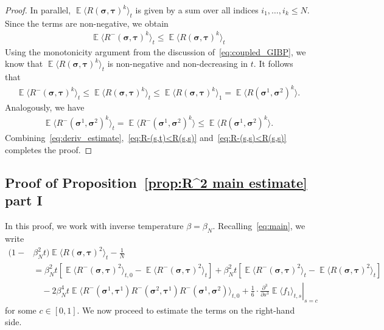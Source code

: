 \documentclass[letterpaper,11pt,reqno]{amsart}
\renewcommand{\leq}{\leqslant}
\newcommand{\ra}{\rangle}
\newcommand{\la}{\langle}
\newcommand{\mvgs}{\boldsymbol{\sigma}}\newcommand{\mvgS}{\boldsymbol{\Sigma}}\newcommand{\mvgt}{\boldsymbol{\tau}}
\DeclareMathOperator{\E}{\mathds{E}}
\begin{document}
\begin{proof}
    In parallel, \(\E \la R(\mvgs, \mvgt)^k \ra_{t}\) is given by a sum over all indices \(i_1, \ldots,i_k \leq N\). 
    Since the terms are non-negative, we obtain
    \begin{align*}
        \E \la R^-(\mvgs, \mvgt)^k \ra_{t} \leq  \E \la R(\mvgs, \mvgt)^k \ra_{t}
    \end{align*}
    Using the monotonicity argument from the discussion of~\eqref{eq:coupled_GIBP}, we know that \(\E \la R(\mvgs, \mvgt)^k \ra_{t}\) is non-negative and non-decreasing in \(t\). It follows that
    \begin{align}\label{eq:R-(s,t)<R(s,s)}
        \E \la R^-(\mvgs, \mvgt)^k \ra_{t}
        \leq \E \la R(\mvgs, \mvgt)^k \ra_{t}
        \leq \E \la R(\mvgs, \mvgt)^k \ra_{1}
        = \E \la R(\mvgs^1, \mvgs^2)^k \ra.
    \end{align}
    Analogously, we have 
    \begin{align}\label{eq:R-(s,s)<R(s,s)}
        \E \la R^-(\mvgs^1, \mvgs^2)^k \ra_{t}
        = \E \la R^-(\mvgs^1, \mvgs^2)^k \ra
        \leq \E \la R(\mvgs^1, \mvgs^2)^k \ra.
    \end{align}
    Combining~\eqref{eq:deriv_estimate},~\eqref{eq:R-(s,t)<R(s,s)} and~\eqref{eq:R-(s,s)<R(s,s)} completes the proof.
\end{proof}


\subsection{Proof of Proposition~\ref{prop:R^2 main estimate} part I}
In this proof, we work with inverse temperature \(\beta=\beta_N\). Recalling~\eqref{eq:main}, we write
\begin{align}
    (1-
    &\beta_N^2 t) \E \la R(\mvgs, \mvgt)^2\ra_{t} - \frac{1}{N} \nonumber \\
    &=  \beta_N^2 t \left[ \E\la R^-(\mvgs, \mvgt)^2 \ra_{t,0} -\E\la R^-(\mvgs, \mvgt)^2 \ra_{t} \right] + \beta_N^2 t \left[ \E\la R^-(\mvgs, \mvgt)^2 \ra_{t} -\E\la R(\mvgs, \mvgt)^2 \ra_{t} \right] \nonumber \\
    &\quad - 2 \beta_N^4 t \E\la R^-(\mvgs^1, \mvgt^1) R^-(\mvgs^2, \mvgt^1) R^-(\mvgs^1, \mvgs^2) \ra_{t,0} 
    + \frac{1}{6} \cdot \left. \frac{\partial^3}{\partial s^3} \E \la f_1 \ra_{t,s} \right|_{s=c} \label{eq:err-total}
\end{align}
for some \(c \in [0,1]\).
We now proceed to estimate the terms on the right-hand side.
\end{document}
